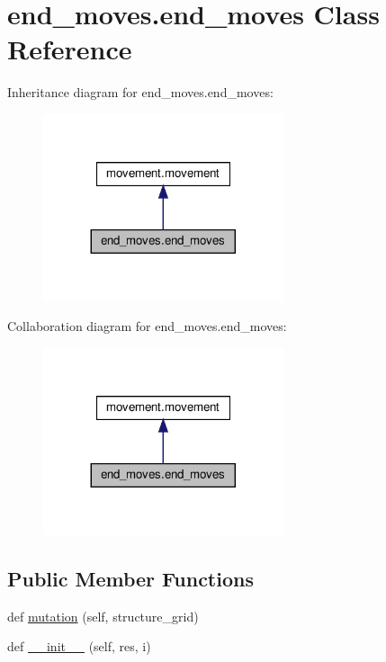 \hypertarget{classend__moves_1_1end__moves}{}\section{end\+\_\+moves.\+end\+\_\+moves Class Reference}
\label{classend__moves_1_1end__moves}


Inheritance diagram for end\+\_\+moves.\+end\+\_\+moves\+:
\nopagebreak
\begin{figure}[H]
\begin{center}
\leavevmode
\includegraphics[width=200pt]{classend__moves_1_1end__moves__inherit__graph}
\end{center}
\end{figure}


Collaboration diagram for end\+\_\+moves.\+end\+\_\+moves\+:
\nopagebreak
\begin{figure}[H]
\begin{center}
\leavevmode
\includegraphics[width=200pt]{classend__moves_1_1end__moves__coll__graph}
\end{center}
\end{figure}
\subsection*{Public Member Functions}
\begin{DoxyCompactItemize}
\item 
def \hyperlink{classend__moves_1_1end__moves_a00ac085203fdadc358c917e4928516c1}{mutation} (self, structure\+\_\+grid)
\item 
def \hyperlink{classend__moves_1_1end__moves_a51b866345b6fb9f3679406b7e26f8d9e}{\+\_\+\+\_\+init\+\_\+\+\_\+} (self, res, i)
\end{DoxyCompactItemize}
